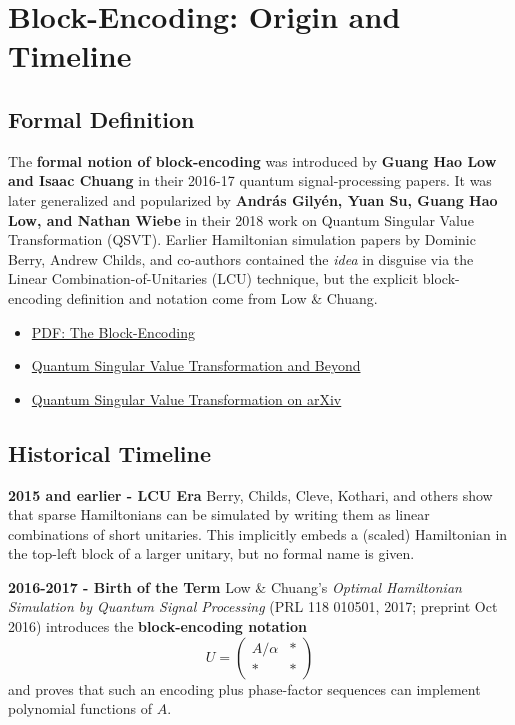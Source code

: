 \documentclass[11pt,a4paper]{article}
\begin{document}
	
\section{Block-Encoding: Origin and Timeline}
	
	\subsection{Formal Definition}
	The \textbf{formal notion of block-encoding} was introduced by \textbf{Guang Hao Low and Isaac Chuang} in their 2016-17 quantum signal-processing papers. It was later generalized and popularized by \textbf{András Gilyén, Yuan Su, Guang Hao Low, and Nathan Wiebe} in their 2018 work on Quantum Singular Value Transformation (QSVT). Earlier Hamiltonian simulation papers by Dominic Berry, Andrew Childs, and co-authors contained the \textit{idea} in disguise via the Linear Combination-of-Unitaries (LCU) technique, but the explicit block-encoding definition and notation come from Low \& Chuang.
	
	\begin{itemize}
		\item \href{https://www.ias.edu/sites/default/files/Tang%20qsvt_lect_1.pdf?utm_source=chatgpt.com}{PDF: The Block-Encoding}
		\item \href{https://dl.acm.org/doi/pdf/10.1145/3313276.3316366?utm_source=chatgpt.com}{Quantum Singular Value Transformation and Beyond}
		\item \href{https://arxiv.org/abs/1806.01838?utm_source=chatgpt.com}{Quantum Singular Value Transformation on arXiv}
	\end{itemize}
	
	\subsection{Historical Timeline}
	
	\textbf{2015 and earlier - LCU Era}  
	Berry, Childs, Cleve, Kothari, and others show that sparse Hamiltonians can be simulated by writing them as linear combinations of short unitaries. This implicitly embeds a (scaled) Hamiltonian in the top-left block of a larger unitary, but no formal name is given.
	
	\textbf{2016-2017 - Birth of the Term}  
	Low \& Chuang’s \textit{Optimal Hamiltonian Simulation by Quantum Signal Processing} (PRL 118 010501, 2017; preprint Oct 2016) introduces the \textbf{block-encoding notation}
	\[
	U = \begin{pmatrix} A/\alpha & * \\ * & * \end{pmatrix}
	\]
	and proves that such an encoding plus phase-factor sequences can implement polynomial functions of $A$.
	
\end{document}
